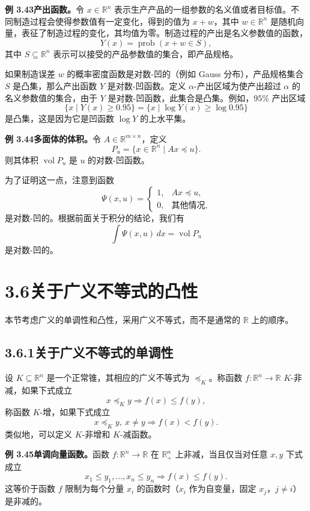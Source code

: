 \documentclass[UTF8,12pt,a4paper,fontset=fandol]{ctexart}
\begin{document}
\noindent\textbf{例 3.43\quad 产出函数。}\quad 令 $x\in\mathbb{R}^n$ 表示生产产品的一组参数的名义值或者目标值。不同制造过程会使得参数值有一定变化，得到的值为 $x+w$，其中 $w\in\mathbb{R}^n$ 是随机向量，表征了制造过程的变化，其均值为零。制造过程的产出是名义参数值的函数，
\[
Y(x)=\operatorname{prob}(x+w\in S),
\]
其中 $S\subseteq\mathbb{R}^n$ 表示可以接受的产品参数值的集合，即产品规格。

如果制造误差 $w$ 的概率密度函数是对数-凹的（例如 Gauss 分布），产品规格集合 $S$ 是凸集，那么产出函数 $Y$ 是对数-凹函数。定义 $\alpha$-产出区域为使产出超过 $\alpha$ 的名义参数值的集合，由于 $Y$ 是对数-凹函数，此集合是凸集。例如，$95\%$ 产出区域
\[
\{x\mid Y(x)\geq0.95\}=\{x\mid \log Y(x)\geq \log0.95\}
\]
是凸集，这是因为它是凹函数 $\log Y$ 的上水平集。

\noindent\textbf{例 3.44\quad 多面体的体积。}\quad 令 $A\in\mathbb{R}^{m\times n}$，定义
\[
P_u=\{x\in\mathbb{R}^n\mid Ax\preceq u\}.
\]
则其体积 $\operatorname{vol}P_u$ 是 $u$ 的对数-凹函数。

为了证明这一点，注意到函数
\[
\Psi(x,u)=
\begin{cases}
1, & Ax\preceq u,\\
0, & \text{其他情况},
\end{cases}
\]
是对数-凹的。根据前面关于积分的结论，我们有
\[
\int\Psi(x,u)\,dx=\operatorname{vol}P_u
\]
是对数-凹的。

\section*{3.6\quad 关于广义不等式的凸性}

本节考虑广义的单调性和凸性，采用广义不等式，而不是通常的 $\mathbb{R}$ 上的顺序。

\subsection*{3.6.1\quad 关于广义不等式的单调性}

设 $K\subseteq\mathbb{R}^n$ 是一个正常锥，其相应的广义不等式为 $\preceq_K$。称函数 $f:\mathbb{R}^n\to\mathbb{R}$ $K$-非减，如果下式成立
\[
x\preceq_K y\Longrightarrow f(x)\leq f(y),
\]
称函数 $K$-增，如果下式成立
\[
x\preceq_K y,\ x\neq y\Longrightarrow f(x)<f(y).
\]
类似地，可以定义 $K$-非增和 $K$-减函数。

\noindent\textbf{例 3.45\quad 单调向量函数。}\quad 函数 $f:\mathbb{R}^n\to\mathbb{R}$ 在 $\mathbb{R}_+^n$ 上非减，当且仅当对任意 $x,y$ 下式成立
\[
x_1\leq y_1,\ldots,x_n\leq y_n\Longrightarrow f(x)\leq f(y).
\]
这等价于函数 $f$ 限制为每个分量 $x_i$ 的函数时（$x_i$ 作为自变量，固定 $x_j$，$j\neq i$）是非减的。
\end{document}
